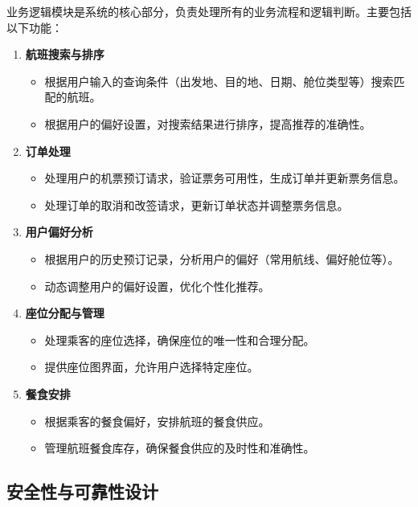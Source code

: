\documentclass[UTF8, a4paper,12pt]{ctexart}
\begin{document}
业务逻辑模块是系统的核心部分，负责处理所有的业务流程和逻辑判断。主要包括以下功能：

\begin{enumerate}
    \item \textbf{航班搜索与排序}
    \begin{itemize}
        \item 根据用户输入的查询条件（出发地、目的地、日期、舱位类型等）搜索匹配的航班。
        \item 根据用户的偏好设置，对搜索结果进行排序，提高推荐的准确性。
    \end{itemize}
    
    \item \textbf{订单处理}
    \begin{itemize}
        \item 处理用户的机票预订请求，验证票务可用性，生成订单并更新票务信息。
        \item 处理订单的取消和改签请求，更新订单状态并调整票务信息。
    \end{itemize}
    
    \item \textbf{用户偏好分析}
    \begin{itemize}
        \item 根据用户的历史预订记录，分析用户的偏好（常用航线、偏好舱位等）。
        \item 动态调整用户的偏好设置，优化个性化推荐。
    \end{itemize}
    
    \item \textbf{座位分配与管理}
    \begin{itemize}
        \item 处理乘客的座位选择，确保座位的唯一性和合理分配。
        \item 提供座位图界面，允许用户选择特定座位。
    \end{itemize}
    
    \item \textbf{餐食安排}
    \begin{itemize}
        \item 根据乘客的餐食偏好，安排航班的餐食供应。
        \item 管理航班餐食库存，确保餐食供应的及时性和准确性。
    \end{itemize}
\end{enumerate}

\subsection{安全性与可靠性设计}
\end{document}
